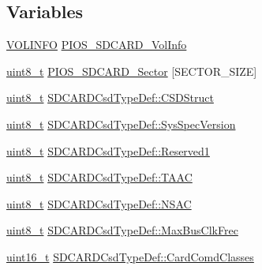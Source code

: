 \subsection*{Variables}
\begin{DoxyCompactItemize}
\item 
\hyperlink{_common_2_libraries_2dosfs_2dosfs_8h_ab15dd212b2a979227ba29f34005a45b7}{V\-O\-L\-I\-N\-F\-O} \hyperlink{group___p_i_o_s___s_d_c_a_r_d_gaeb82765ef4d7741f373422b30dba4f32}{P\-I\-O\-S\-\_\-\-S\-D\-C\-A\-R\-D\-\_\-\-Vol\-Info}
\item 
\hyperlink{stdint_8h_aba7bc1797add20fe3efdf37ced1182c5}{uint8\-\_\-t} \hyperlink{group___p_i_o_s___s_d_c_a_r_d_ga51dd7d1ab7b2ae3878345834e20546a6}{P\-I\-O\-S\-\_\-\-S\-D\-C\-A\-R\-D\-\_\-\-Sector} \mbox{[}S\-E\-C\-T\-O\-R\-\_\-\-S\-I\-Z\-E\mbox{]}
\item 
\hyperlink{stdint_8h_aba7bc1797add20fe3efdf37ced1182c5}{uint8\-\_\-t} \hyperlink{group___p_i_o_s___s_d_c_a_r_d_ga49354de313b96595043a78940055d651}{S\-D\-C\-A\-R\-D\-Csd\-Type\-Def\-::\-C\-S\-D\-Struct}
\item 
\hyperlink{stdint_8h_aba7bc1797add20fe3efdf37ced1182c5}{uint8\-\_\-t} \hyperlink{group___p_i_o_s___s_d_c_a_r_d_ga68ba16a5f115dc00b88d70d6912a1c45}{S\-D\-C\-A\-R\-D\-Csd\-Type\-Def\-::\-Sys\-Spec\-Version}
\item 
\hyperlink{stdint_8h_aba7bc1797add20fe3efdf37ced1182c5}{uint8\-\_\-t} \hyperlink{group___p_i_o_s___s_d_c_a_r_d_ga8d15c8c3b9e293b1b62efea47010180d}{S\-D\-C\-A\-R\-D\-Csd\-Type\-Def\-::\-Reserved1}
\item 
\hyperlink{stdint_8h_aba7bc1797add20fe3efdf37ced1182c5}{uint8\-\_\-t} \hyperlink{group___p_i_o_s___s_d_c_a_r_d_gaec29af38b2fc16f147533e11c61e2787}{S\-D\-C\-A\-R\-D\-Csd\-Type\-Def\-::\-T\-A\-A\-C}
\item 
\hyperlink{stdint_8h_aba7bc1797add20fe3efdf37ced1182c5}{uint8\-\_\-t} \hyperlink{group___p_i_o_s___s_d_c_a_r_d_ga8573c74ea99da2cfb8f4848fa4350491}{S\-D\-C\-A\-R\-D\-Csd\-Type\-Def\-::\-N\-S\-A\-C}
\item 
\hyperlink{stdint_8h_aba7bc1797add20fe3efdf37ced1182c5}{uint8\-\_\-t} \hyperlink{group___p_i_o_s___s_d_c_a_r_d_ga9413a0371dfa0c4bf305c922b10392f1}{S\-D\-C\-A\-R\-D\-Csd\-Type\-Def\-::\-Max\-Bus\-Clk\-Frec}
\item 
\hyperlink{stdint_8h_a273cf69d639a59973b6019625df33e30}{uint16\-\_\-t} \hyperlink{group___p_i_o_s___s_d_c_a_r_d_ga6684006d87c1e8fda9008685fd83698b}{S\-D\-C\-A\-R\-D\-Csd\-Type\-Def\-::\-Card\-Comd\-Classes}
\item 

\end{DoxyCompactItemize}
